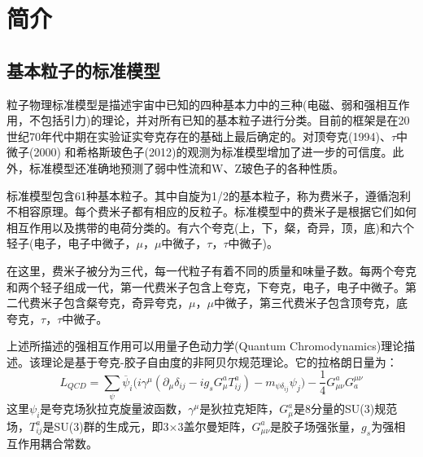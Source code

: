 

\setcounter{section}{0}



\chapter{简介}

\setcounter{section}{0}

\setcounter{figure}{0}
\setcounter{table}{0}
\setcounter{equation}{0}

\bigskip

\section{基本粒子的标准模型}


粒子物理标准模型是描述宇宙中已知的四种基本力中的三种(电磁、弱和强相互作用，不包括引力)的理论，并对所有已知的基本粒子进行分类。目前的框架是在20世纪70年代中期在实验证实夸克存在的基础上最后确定的。对顶夸克(1994)\cite{abe1994evidence,abachi1995observation,d01996observation}、$\tau$中微子(2000)\cite{kodama2001observation} 和希格斯玻色子(2012)\cite{aad2012observation,chatrchyan2012observation}的观测为标准模型增加了进一步的可信度。此外，标准模型还准确地预测了弱中性流和W、Z玻色子的各种性质。

标准模型包含61种基本粒子。其中自旋为1/2的基本粒子，称为费米子，遵循泡利不相容原理。每个费米子都有相应的反粒子。标准模型中的费米子是根据它们如何相互作用以及携带的电荷分类的。有六个夸克(上，下，粲，奇异，顶，底)和六个轻子(电子，电子中微子，$\mu$，$\mu$中微子，$\tau$，$\tau$中微子)。

在这里，费米子被分为三代，每一代粒子有着不同的质量和味量子数。每两个夸克和两个轻子组成一代，第一代费米子包含上夸克，下夸克，电子，电子中微子。第二代费米子包含粲夸克，奇异夸克，$\mu$，$\mu$中微子，第三代费米子包含顶夸克，底夸克，$\tau$，$\tau$中微子。

上述所描述的强相互作用可以用量子色动力学(Quantum Chromodynamics)理论描述。该理论是基于夸克-胶子自由度的非阿贝尔规范理论。它的拉格朗日量为：
\begin{equation}
L_{QCD} = \sum_{\psi} \overline \psi_{i} \big (i\gamma^{\mu}(\partial_{\mu}\delta_{ij} - ig_{s}G^{a}_{\mu}T^{a}_{ij}) -m_{\psi\delta_{ij}}\psi_{j} \big ) - \frac{1}{4} G^{a}_{\mu\nu} G^{\mu\nu}_{a}
\end{equation}
这里$\psi_{i}$是夸克场狄拉克旋量波函数，$\gamma^{\mu}$是狄拉克矩阵，$G^{a}_{\mu}$是8分量的SU(3)规范场，$T^{a}_{ij}$是SU(3)群的生成元，即3$\times$3盖尔曼矩阵，$G^{a}_{\mu\nu}$是胶子场强张量，$g_{s}$为强相互作用耦合常数。





